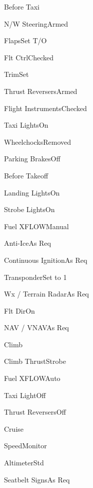 \documentclass[sim-use, halfpage]{checklist}
\begin{document}
\begin{checklist}{Before Taxi}
    \item{N/W Steering}{Armed}
    \item{Flaps}{Set T/O}
    \item{Flt Ctrl}{Checked}
    \item{Trim}{Set}
    \item{Thrust Reversers}{Armed}
    \item{Flight Instruments}{Checked}
    \item{Taxi Lights}{On}
    \item{Wheelchocks}{Removed}
    \item{Parking Brakes}{Off}
\end{checklist}

\begin{checklist}{Before Takeoff}
    \item{Landing Lights}{On}
    \item{Strobe Lights}{On}
    \item{Fuel XFLOW}{Manual}
    \item{Anti-Ice}{As Req}
    \item{Continuous Ignition}{As Req}
    \item{Transponder}{Set to 1}
    \item{Wx / Terrain Radar}{As Req}
    \item{Flt Dir}{On}
    \item{NAV / VNAV}{As Req}
\end{checklist}

\begin{checklist}{Climb}
    \item{Climb Thrust}{Strobe}
    \item{Fuel XFLOW}{Auto}
    \item{Taxi Light}{Off}
    \item{Thrust Reversers}{Off}
\end{checklist}

\begin{checklist}{Cruise}
    \item{Speed}{Monitor}
    \item{Altimeter}{Std}
    \item{Seatbelt Signs}{As Req}
\end{checklist}  
\end{document}

